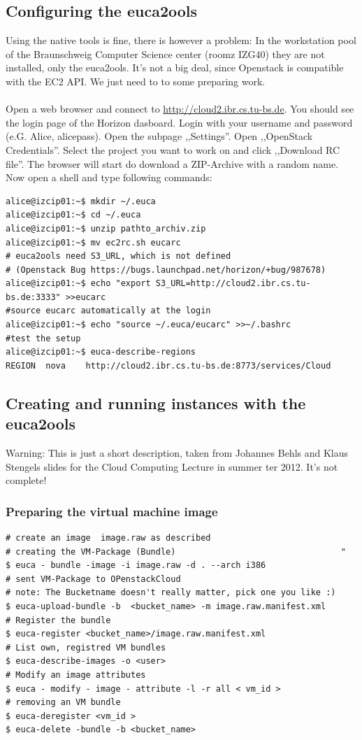 \documentclass[a4paper,ngerman,bibtotocliststotoc]{scrartcl}
\begin{document}
\subsection{Configuring the euca2ools}
\label{sec:conf-euca2}
Using the native tools is fine, there is however a problem: In the
workstation pool of the Braunschweig Computer Science center (roomz
IZG40) they are not installed, only the euca2ools. It's not a big
deal, since Openstack is compatible with the EC2 API. We just need to
to some preparing work.\\\\
Open a web browser and connect to
\url{http://cloud2.ibr.cs.tu-bs.de}. You should see the login page of
the Horizon dasboard. Login with your username and password
(e.G. Alice, alicepass). Open the subpage ,,Settings''. Open
,,OpenStack Credentials''. Select the project you want to work on and
click ,,Download RC file''. The browser will start do download a
ZIP-Archive with a random name. Now open a shell and type following
commands:
\begin{verbatim}
alice@izcip01:~$ mkdir ~/.euca
alice@izcip01:~$ cd ~/.euca
alice@izcip01:~$ unzip pathto_archiv.zip
alice@izcip01:~$ mv ec2rc.sh eucarc
# euca2ools need S3_URL, which is not defined 
# (Openstack Bug https://bugs.launchpad.net/horizon/+bug/987678)
alice@izcip01:~$ echo "export S3_URL=http://cloud2.ibr.cs.tu-bs.de:3333" >>eucarc
#source eucarc automatically at the login
alice@izcip01:~$ echo "source ~/.euca/eucarc" >>~/.bashrc
#test the setup
alice@izcip01:~$ euca-describe-regions
REGION  nova    http://cloud2.ibr.cs.tu-bs.de:8773/services/Cloud
\end{verbatim}

\subsection{Creating and running instances with the euca2ools}
\label{sec:creat-runn-inst-ec2}
Warning: This is just a short description, taken from Johannes Behls
and Klaus Stengels slides for the Cloud Computing Lecture in summer
ter 2012. It's not complete!

\subsubsection{Preparing the virtual machine image}
\label{sec:prep-virt-mach}


\begin{verbatim}
# create an image  image.raw as described 
# creating the VM-Package (Bundle)                                 "
$ euca - bundle -image -i image.raw -d . --arch i386
# sent VM-Package to OPenstackCloud
# note: The Bucketname doesn't really matter, pick one you like :)
$ euca-upload-bundle -b  <bucket_name> -m image.raw.manifest.xml
# Register the bundle
$ euca-register <bucket_name>/image.raw.manifest.xml 
# List own, registred VM bundles
$ euca-describe-images -o <user>
# Modify an image attributes 
$ euca - modify - image - attribute -l -r all < vm_id >
# removing an VM bundle
$ euca-deregister <vm_id >
$ euca-delete -bundle -b <bucket_name>
\end{verbatim}
\end{document}
